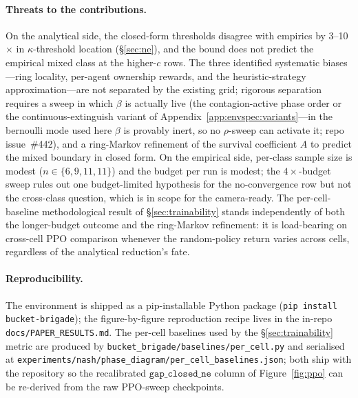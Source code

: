 \documentclass{anvil-paper}
\begin{document}
\paragraph{Threats to the contributions.}
On the analytical side, the closed-form thresholds disagree with
empirics by 3--10$\times$ in $\kappa$-threshold location
(\S\ref{sec:ne}), and the bound does not predict the empirical
\textsf{mixed} class at the higher-$c$ rows. The three identified
systematic biases---ring locality, per-agent ownership rewards, and the
heuristic-strategy approximation---are not separated by the existing
grid; rigorous separation requires a sweep in which $\beta$ is actually
live (the contagion-active phase order or the continuous-extinguish
variant of Appendix~\ref{app:envspec:variants}---in the bernoulli mode
used here $\beta$ is provably inert, so no $\rho$-sweep can activate it;
repo issue~\#442), and a
ring-Markov refinement of the survival coefficient $A$ to predict the
\textsf{mixed} boundary in closed form. On the empirical side, per-class
sample size is modest ($n\in\{6,9,11,11\}$) and the budget per run is
modest; the $4{\times}$-budget sweep rules out one budget-limited
hypothesis for the no-convergence row but not the cross-class question,
which is in scope for the camera-ready. The per-cell-baseline
methodological result of \S\ref{sec:trainability} stands independently
of both the longer-budget outcome and the ring-Markov refinement: it is
load-bearing on cross-cell PPO comparison whenever the random-policy
return varies across cells, regardless of the analytical reduction's
fate.

\paragraph{Reproducibility.}
The environment is shipped as a pip-installable Python package
(\texttt{pip install bucket-brigade}); the figure-by-figure reproduction
recipe lives in the in-repo \texttt{docs/PAPER\_RESULTS.md}. The per-cell
baselines used by the \S\ref{sec:trainability} metric are produced by
\texttt{bucket\_brigade/baselines/per\_cell.py} and serialised at
\texttt{experiments/nash/phase\_diagram/per\_cell\_baselines.json}; both
ship with the repository so the recalibrated $\texttt{gap\_closed\_ne}$
column of Figure~\ref{fig:ppo} can be re-derived from the raw PPO-sweep
checkpoints.
\end{document}

